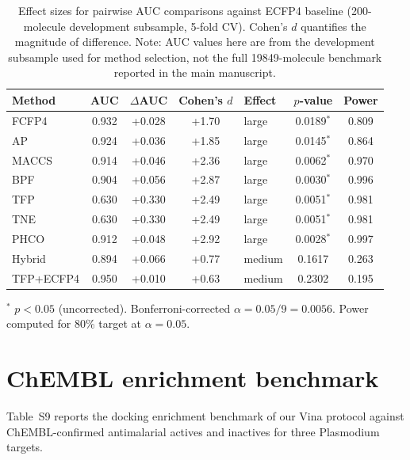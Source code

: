 \documentclass[11pt,a4paper]{article}
\begin{document}
\begin{table}[htbp]
\centering
\caption{Effect sizes for pairwise AUC comparisons against ECFP4 baseline (200-molecule development subsample, 5-fold CV). Cohen's $d$ quantifies the magnitude of difference. Note: AUC values here are from the development subsample used for method selection, not the full \num{19849}-molecule benchmark reported in the main manuscript.}
\label{tab:effect_sizes}
\begin{tabularx}{\textwidth}{l S[table-format=1.3] S[table-format=+1.3] S[table-format=+1.2] l S[table-format=1.4] S[table-format=1.3]}
\toprule
Method & {AUC} & {$\Delta$AUC} & {Cohen's $d$} & {Effect} & {$p$-value} & {Power} \\
\midrule
FCFP4 & 0.932 & +0.028 & +1.70 & large & 0.0189$^{\ast}$ & 0.809 \\
AP & 0.924 & +0.036 & +1.85 & large & 0.0145$^{\ast}$ & 0.864 \\
MACCS & 0.914 & +0.046 & +2.36 & large & 0.0062$^{\ast}$ & 0.970 \\
BPF & 0.904 & +0.056 & +2.87 & large & 0.0030$^{\ast}$ & 0.996 \\
TFP & 0.630 & +0.330 & +2.49 & large & 0.0051$^{\ast}$ & 0.981 \\
TNE & 0.630 & +0.330 & +2.49 & large & 0.0051$^{\ast}$ & 0.981 \\
PHCO & 0.912 & +0.048 & +2.92 & large & 0.0028$^{\ast}$ & 0.997 \\
Hybrid & 0.894 & +0.066 & +0.77 & medium & 0.1617 & 0.263 \\
TFP+ECFP4 & 0.950 & +0.010 & +0.63 & medium & 0.2302 & 0.195 \\
\bottomrule
\end{tabularx}
\vspace{1mm}
\footnotesize $^{\ast}$ $p < 0.05$ (uncorrected). Bonferroni-corrected $\alpha = 0.05/9 = 0.0056$. Power computed for 80\% target at $\alpha = 0.05$.
\end{table}



\section{ChEMBL enrichment benchmark}
\label{sec:chembl_enrichment}

Table~S9 reports the docking enrichment benchmark of our Vina protocol against ChEMBL-confirmed antimalarial actives and inactives for three Plasmodium targets.
\end{document}
